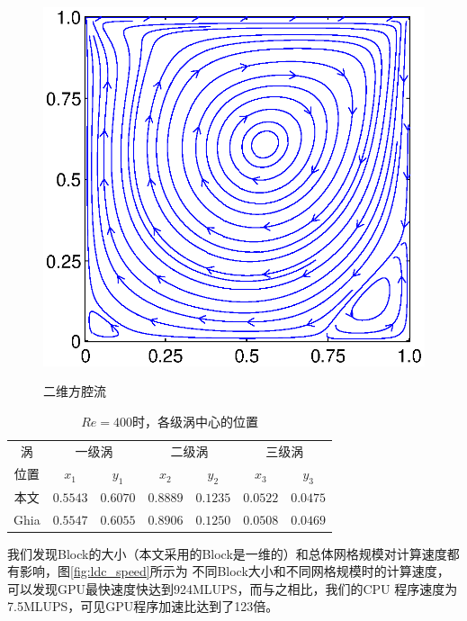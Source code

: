 \begin{figure}[htb]
{\begin{minipage}[b]{0.38\textwidth}
      \includegraphics[width=1\textwidth]{img/ldc_stream}
      \label{fig:ldc_b}
    \end{minipage}
  }
  \caption{二维方腔流}
\end{figure}

\begin{table}
  \centering
  \begin{tabular}{*{7}{c}}
    \toprule
涡    & \multicolumn{2}{c}{一级涡} & \multicolumn{2}{c}{二级涡} & \multicolumn{2}{c}{三级涡}  \\ \cline{2-3} \cline{4-5} \cline{6-7}
位置    & $x_1$ & $y_1$              & $x_2$ & $y_2$              & $x_3$ & $y_3$          \\ \midrule
本文& $0.5543$ & $0.6070$        & $0.8889$ & $0.1235$        & $0.0522$ & $0.0475$        \\ \hline
Ghia& $0.5547$ & $0.6055$        & $0.8906$ & $0.1250$        & $0.0508$ & $0.0469$        \\ \bottomrule
  \end{tabular}
  \caption{$Re=400$时，各级涡中心的位置}
  \label{tab:ldc}
\end{table}

我们发现Block的大小（本文采用的Block是一维的）和总体网格规模对计算速度都有影响，图\ref{fig:ldc_speed}所示为
不同Block大小和不同网格规模时的计算速度，可以发现GPU最快速度快达到924MLUPS，而与之相比，我们的CPU
程序速度为7.5MLUPS，可见GPU程序加速比达到了123倍。

